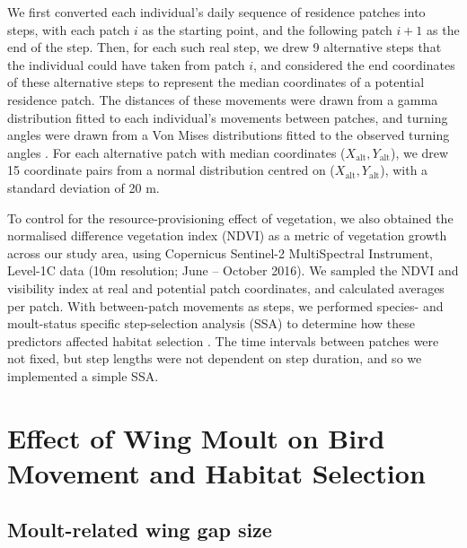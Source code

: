 We first converted each individual's daily sequence of residence patches into steps, with each patch $i$ as the starting point, and the following patch $i+1$ as the end of the step.
Then, for each such real step, we drew 9 alternative steps that the individual could have taken from patch $i$, and considered the end coordinates of these alternative steps to represent the median coordinates of a potential residence patch.
The distances of these movements were drawn from a gamma distribution fitted to each individual's movements between patches, and turning angles were drawn from a Von Mises distributions fitted to the observed turning angles \citep{signer2019}.
For each alternative patch with median coordinates ($X_\text{alt}, Y_\text{alt}$), we drew 15 coordinate pairs from a normal distribution centred on ($X_\text{alt}, Y_\text{alt}$), with a standard deviation of 20 m.


To control for the resource-provisioning effect of vegetation, we also obtained the normalised difference vegetation index (NDVI) as a metric of vegetation growth \citep{pettorelli2011} across our study area, using Copernicus Sentinel-2 MultiSpectral Instrument, Level-1C data (10m resolution; June -- October 2016).
We sampled the NDVI and visibility index at real and potential patch coordinates, and calculated averages per patch.
With between-patch movements as steps, we performed species- and moult-status specific step-selection analysis (SSA) to determine how these predictors affected habitat selection \parencite[][see \textit{Supplementary Information}]{avgar2016}.
The time intervals between patches were not fixed, but step lengths were not dependent on step duration, and so we implemented a simple SSA.

\section*{Effect of Wing Moult on Bird Movement and Habitat Selection}

\subsection*{Moult-related wing gap size}

